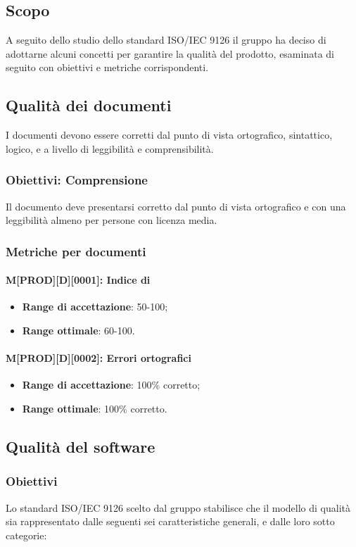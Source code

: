 \subsection{Scopo}
A seguito dello studio dello standard ISO/IEC 9126 il gruppo ha deciso di adottarne alcuni concetti per garantire la qualità del prodotto, esaminata di seguito con obiettivi e metriche corrispondenti.

\subsection{Qualità dei documenti}
I documenti devono essere corretti dal punto di vista ortografico, sintattico, logico, e a livello di leggibilità e comprensibilità.

\subsubsection{Obiettivi: Comprensione}
Il documento deve presentarsi corretto dal punto di vista ortografico e con una leggibilità almeno per persone con licenza media.
\subsubsection{Metriche per documenti}
\paragraph{M[PROD][D][0001]: Indice di }
\begin{itemize}
    \item \textbf{Range di accettazione}: 50-100;
    \item \textbf{Range ottimale}: 60-100.
\end{itemize}
\paragraph{M[PROD][D][0002]: Errori ortografici}
\begin{itemize}
    \item \textbf{Range di accettazione}: 100\% corretto;
    \item \textbf{Range ottimale}: 100\% corretto.
\end{itemize}

\subsection{Qualità del software}
\subsubsection{Obiettivi} 
Lo standard ISO/IEC 9126 scelto dal gruppo stabilisce che il modello di qualità sia rappresentato dalle seguenti sei caratteristiche generali, e dalle loro sotto categorie:
